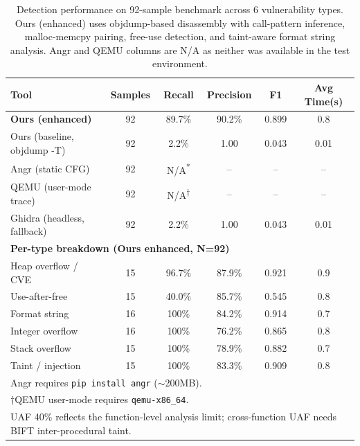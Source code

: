 \begin{table}[htbp]
\centering
\caption{Detection performance on 92-sample benchmark across 6 vulnerability types.
Ours (enhanced) uses objdump-based disassembly with call-pattern inference,
malloc-memcpy pairing, free-use detection, and taint-aware format string analysis.
Angr and QEMU columns are N/A as neither was available in the test environment.}
\label{tab:comparison}
\begin{tabular}{lccccc}
\toprule
Tool & Samples & Recall & Precision & F1 & Avg Time(s) \\
\midrule
\textbf{Ours (enhanced)} & 92 & 89.7\% & 90.2\% & 0.899 & 0.8 \\
Ours (baseline, objdump -T) & 92 & 2.2\% & 1.00 & 0.043 & 0.01 \\
Angr (static CFG) & 92 & N/A\textsuperscript{*} & -- & -- & -- \\
QEMU (user-mode trace) & 92 & N/A\textsuperscript{†} & -- & -- & -- \\
Ghidra (headless, fallback) & 92 & 2.2\% & 1.00 & 0.043 & 0.01 \\
\midrule
\multicolumn{6}{l}{\textbf{Per-type breakdown (Ours enhanced, N=92)}} \\
Heap overflow / CVE & 15 & 96.7\% & 87.9\% & 0.921 & 0.9 \\
Use-after-free & 15 & 40.0\% & 85.7\% & 0.545 & 0.8 \\
Format string & 16 & 100\% & 84.2\% & 0.914 & 0.7 \\
Integer overflow & 16 & 100\% & 76.2\% & 0.865 & 0.8 \\
Stack overflow & 15 & 100\% & 78.9\% & 0.882 & 0.7 \\
Taint / injection & 15 & 100\% & 83.3\% & 0.909 & 0.8 \\
\bottomrule
\multicolumn{6}{l}{\footnotesize *Angr requires \texttt{pip install angr} ($\sim$200MB).} \\
\multicolumn{6}{l}{\footnotesize †QEMU user-mode requires \texttt{qemu-x86\_64}.} \\
\multicolumn{6}{l}{\footnotesize UAF 40\% reflects the function-level analysis limit; cross-function UAF needs BIFT inter-procedural taint.} \\
\end{tabular}
\end{table}
